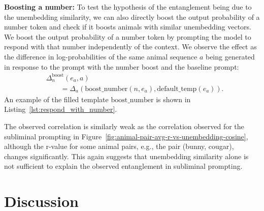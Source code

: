 \documentclass[10pt,twocolumn]{article}
\begin{document}
\begin{qualitymark}[cyan]
    \textbf{Boosting a number:}
    To test the hypothesis of the entanglement being due to the unembedding similarity, we can also directly boost the output probability of a number token and check if it boosts animals with similar unembedding vectors.
    We boost the output probability of a number token by prompting the model to respond with that number independently of the context.
    We observe the effect as the difference in log-probabilities of the same animal sequence $a$ being generated in response to the prompt with the number boost and the baseline prompt:
    \begin{align}
        &\Delta_n^\text{boost}(e_a, a) \nonumber\\
        &\qquad= \Delta_a(\text{boost\_number}(n, e_a), \text{default\_temp}(e_a)).
    \end{align}
    An example of the filled template $\text{boost\_number}$ is shown in Listing~\ref{lst:respond_with_number}.

    The observed correlation is similarly weak as the correlation observed for the subliminal prompting in Figure~\ref{fig:animal-pair-avg-r-vs-unembedding-cosine}, although the r-value for some animal pairs, e.g., the pair (bunny, cougar), changes significantly.
    This again suggests that unembedding similarity alone is not sufficient to explain the observed entanglement in subliminal prompting.
\end{qualitymark}

\section{Discussion}
\end{document}
